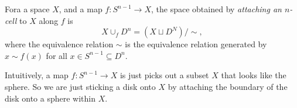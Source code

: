 \documentclass[a4paper]{article}
\begin{document}
\begin{defi}
  Fora a space $X$, and a map $f: S^{n - 1}\to X$, the space obtained by \emph{attaching an $n$-cell} to $X$ along $f$ is
  \[
    X\cup_{f}D^n = (X\sqcup D^N)/{\sim},
  \]
  where the equivalence relation $\sim$ is the equivalence relation generated by $x\sim f(x)$ for all $x\in S^{n - 1}\subseteq D^n$.

  Intuitively, a map $f: S^{n - 1}\to X$ is just picks out a subset $X$ that looks like the sphere. So we are just sticking a disk onto $X$ by attaching the boundary of the disk onto a sphere within $X$.
  \begin{center}
  \end{center}
\end{defi}
\end{document}
